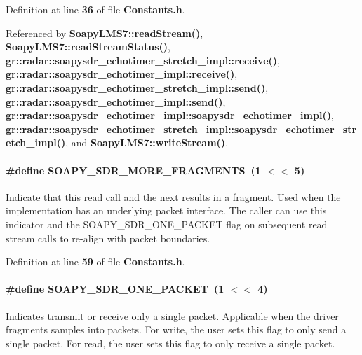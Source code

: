 Definition at line {\bf 36} of file {\bf Constants.\+h}.



Referenced by {\bf Soapy\+L\+M\+S7\+::read\+Stream()}, {\bf Soapy\+L\+M\+S7\+::read\+Stream\+Status()}, {\bf gr\+::radar\+::soapysdr\+\_\+echotimer\+\_\+stretch\+\_\+impl\+::receive()}, {\bf gr\+::radar\+::soapysdr\+\_\+echotimer\+\_\+impl\+::receive()}, {\bf gr\+::radar\+::soapysdr\+\_\+echotimer\+\_\+stretch\+\_\+impl\+::send()}, {\bf gr\+::radar\+::soapysdr\+\_\+echotimer\+\_\+impl\+::send()}, {\bf gr\+::radar\+::soapysdr\+\_\+echotimer\+\_\+impl\+::soapysdr\+\_\+echotimer\+\_\+impl()}, {\bf gr\+::radar\+::soapysdr\+\_\+echotimer\+\_\+stretch\+\_\+impl\+::soapysdr\+\_\+echotimer\+\_\+stretch\+\_\+impl()}, and {\bf Soapy\+L\+M\+S7\+::write\+Stream()}.

\paragraph[{S\+O\+A\+P\+Y\+\_\+\+S\+D\+R\+\_\+\+M\+O\+R\+E\+\_\+\+F\+R\+A\+G\+M\+E\+N\+TS}]{\setlength{\rightskip}{0pt plus 5cm}\#define S\+O\+A\+P\+Y\+\_\+\+S\+D\+R\+\_\+\+M\+O\+R\+E\+\_\+\+F\+R\+A\+G\+M\+E\+N\+TS~(1 $<$$<$ 5)}\label{Constants_8h_a8cae27664b920aee4f0c4e73fe9aeaa8}
Indicate that this read call and the next results in a fragment. Used when the implementation has an underlying packet interface. The caller can use this indicator and the S\+O\+A\+P\+Y\+\_\+\+S\+D\+R\+\_\+\+O\+N\+E\+\_\+\+P\+A\+C\+K\+ET flag on subsequent read stream calls to re-\/align with packet boundaries. 

Definition at line {\bf 59} of file {\bf Constants.\+h}.

\paragraph[{S\+O\+A\+P\+Y\+\_\+\+S\+D\+R\+\_\+\+O\+N\+E\+\_\+\+P\+A\+C\+K\+ET}]{\setlength{\rightskip}{0pt plus 5cm}\#define S\+O\+A\+P\+Y\+\_\+\+S\+D\+R\+\_\+\+O\+N\+E\+\_\+\+P\+A\+C\+K\+ET~(1 $<$$<$ 4)}\label{Constants_8h_a057756939615507a742ed89f54044d5a}
Indicates transmit or receive only a single packet. Applicable when the driver fragments samples into packets. For write, the user sets this flag to only send a single packet. For read, the user sets this flag to only receive a single packet. 

